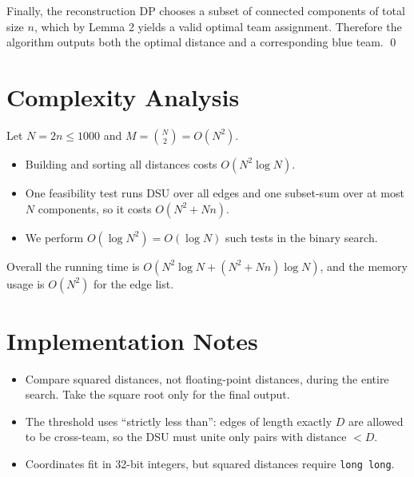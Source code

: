 \documentclass[11pt]{article}
\begin{document}
Finally, the reconstruction DP chooses a subset of connected components of total size $n$, which by Lemma 2 yields a valid optimal team assignment. Therefore the algorithm outputs both the optimal distance and a corresponding blue team. \qed

\section*{Complexity Analysis}

Let $N=2n \le 1000$ and $M=\binom{N}{2} = O(N^2)$.

\begin{itemize}[leftmargin=*]
    \item Building and sorting all distances costs $O(N^2 \log N)$.
    \item One feasibility test runs DSU over all edges and one subset-sum over at most $N$ components, so it costs $O(N^2 + Nn)$.
    \item We perform $O(\log N^2)=O(\log N)$ such tests in the binary search.
\end{itemize}

Overall the running time is $O(N^2 \log N + (N^2 + Nn)\log N)$, and the memory usage is $O(N^2)$ for the edge list.

\section*{Implementation Notes}

\begin{itemize}[leftmargin=*]
    \item Compare squared distances, not floating-point distances, during the entire search. Take the square root only for the final output.
    \item The threshold uses ``strictly less than'': edges of length exactly $D$ are allowed to be cross-team, so the DSU must unite only pairs with distance $< D$.
    \item Coordinates fit in 32-bit integers, but squared distances require \texttt{long long}.
\end{itemize}
\end{document}
